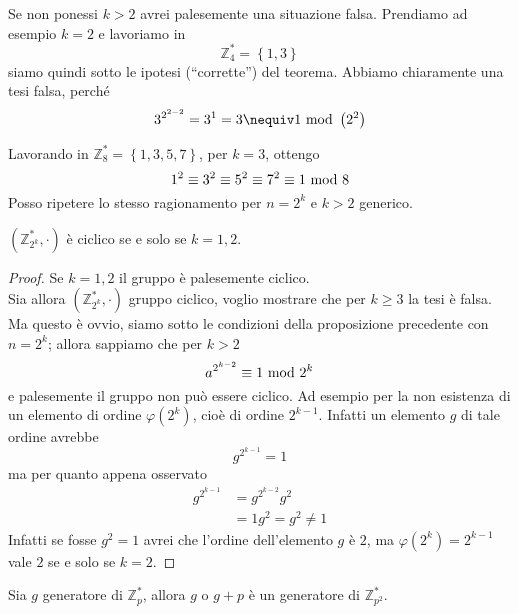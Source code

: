 \begin{controesempio}
	Se non ponessi $k>2$ avrei palesemente una situazione falsa. Prendiamo ad esempio $k=2$ e lavoriamo in
	\begin{equation*}
	\mathbb{Z}_4^*=\left\{1,3\right\}
	\end{equation*}
	siamo quindi sotto le ipotesi (\enquote{corrette}) del teorema. Abbiamo chiaramente una tesi falsa, perché
	\begin{equation*}
	3^{2^{2-2}}=3^{1}=3\nequiv1\Mod\left(2^2\right)
	\end{equation*} 
\end{controesempio}
\begin{esempio}
	Lavorando in $\mathbb{Z}_8^*=\left\{1,3,5,7\right\}$, per $k=3$, ottengo 
	\begin{equation*}
	1^2\equiv3^2\equiv5^2\equiv7^2\equiv1\ \mathrm{mod}\ 8
	\end{equation*}
	Posso ripetere lo stesso ragionamento per $n=2^k$ e $k>2$ generico.
\end{esempio}
\begin{corollario}
	$\left(\mathbb{Z}_{2^k}^*,\cdot\right)$ è ciclico se e solo se $k=1,2$.
\end{corollario}
\begin{proof}
	Se $k=1,2$ il gruppo è palesemente ciclico. \\ Sia allora $\left(\mathbb{Z}_{2^k}^*,\cdot\right)$ gruppo ciclico, voglio mostrare che per $k\geq3$ la tesi è falsa. Ma questo è ovvio, siamo sotto le condizioni della proposizione precedente con $n=2^k$; allora sappiamo che per $k>2$
	\begin{equation*}
	a^{2^{k-2}}\equiv1\ \mathrm{mod}\ 2^k
	\end{equation*}
	e palesemente il gruppo non può essere ciclico. Ad esempio per la non esistenza di un elemento di ordine $\varphi(2^k)$, cioè di ordine $2^{k-1}$. Infatti un elemento $g$ di tale ordine avrebbe 
	\begin{equation*}
	g^{2^{k-1}}=1
	\end{equation*}
	ma per quanto appena osservato
	\begin{align*}
	g^{2^{k-1}}
	&=g^{2^{k-2}}g^{2}\\
	&=1g^{2}=g^{2}\neq1
	\end{align*}
	Infatti se fosse $g^2=1$ avrei che l'ordine dell'elemento $g$ è $2$, ma $\varphi(2^k)=2^{k-1}$ vale $2$ se e solo se $k=2$.
\end{proof}
\begin{teorema}
	Sia $g$ generatore di $\mathbb{Z}_p^*$, allora $g$ o $g+p$ è un generatore di $\mathbb{Z}_{p^2}^*$.
\end{teorema}

